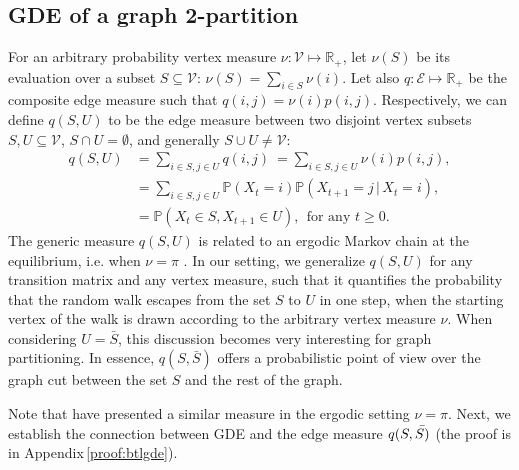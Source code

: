 \documentclass[10pt]{article} %
\makeatletter
\def\gV{{\mathcal{V}}}
\newcommand{\q}{q}
\newcommand{\GDE}{GDE\xspace}
\newcommand{\ie}   			{i.e.\@\xspace}
\newcommand{\padded}[1] {\,#1\,}
\makeatother
\begin{document}
\subsection{\GDE of a graph \texorpdfstring{$\boldsymbol{2}$}{2}-partition}
%
\label{sec:2-way-GDE}
%
For an arbitrary probability vertex measure $\nu: \gV \mapsto \mathbb{R}_{+}$, let $\nu(S)$ be its evaluation over a subset $S \subseteq \gV $: $\nu(S) = \sum_{i \in S} \nu(i)$. Let also $\q:\mathcal{E}\mapsto \mathbb{R}_{+}$ be the composite edge measure such that $\q(i,j) = \nu(i)p(i,j)$. Respectively, we can define $\q(S,U)$ to be the edge measure between two disjoint vertex subsets $S,U\subseteq \gV $, $S \cap U = \emptyset$, and generally $S \cup U \neq \gV $:
%
\begin{align}
  \q(S,U)&=\sum_{i\in S, j\in U}\q(i,j)\ = \sum_{i\in S, j\in U} \nu(i)p(i,j), \nonumber\\
  &= \sum_{i\in S, j\in U}\mathbb{P}(X_t=i) \mathbb{P}(X_{t+1}=j\padded{|}X_t=i),\nonumber\\
  &=\mathbb{P}(X_t\in S,X_{t+1}\in U), \ \ \text{for any } t\geq 0. \label{eq:rw_cut}
\end{align}
%
The generic measure $\q(S,U)$ is related to an ergodic Markov chain at the equilibrium, \ie when $\nu = \pi$ \citep{sinclair1992improved,levin2017markov}. In our setting, we generalize $\q(S,U)$ for any transition matrix and any vertex measure, such that it quantifies the probability that the random walk escapes from the set $S$ to $U$ in one step, when the starting vertex of the walk is drawn according to the arbitrary vertex measure $\nu$.
%
When considering $U = \bar{S}$, this discussion becomes very interesting for graph partitioning. In essence, $\q(S,\bar{S})$ offers a probabilistic point of view over the graph cut between the set $S$ and the rest of the graph.

Note that \cite{meilua2001random} have presented a similar measure %
in the ergodic setting $\nu = \pi$. Next, we establish the connection between \GDE and the edge measure $\q(S,\Bar{S)}$ (the proof is in Appendix\,\ref{proof:btlgde}).
\end{document}
